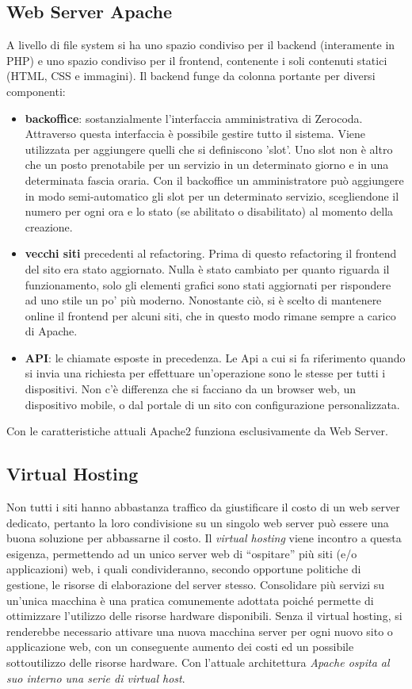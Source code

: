 \subsection{Web Server Apache}
A livello di file system si ha uno spazio condiviso per il backend (interamente in PHP) e uno spazio condiviso per il frontend, contenente i soli contenuti statici (HTML, CSS e immagini). Il backend funge da colonna portante per diversi componenti:
\begin{itemize}
    \item \textbf{backoffice}: sostanzialmente l'interfaccia amministrativa di Zerocoda. Attraverso questa interfaccia è possibile gestire tutto il sistema. Viene utilizzata per aggiungere quelli che si definiscono 'slot'. Uno slot non è altro che un posto prenotabile per un servizio in un determinato giorno e in una determinata fascia oraria. Con il backoffice un amministratore può aggiungere in modo semi-automatico gli slot per un determinato servizio, scegliendone il numero per ogni ora e lo stato (se abilitato o disabilitato) al momento della creazione.
    \item \textbf{vecchi siti } precedenti al refactoring. Prima di questo refactoring il frontend del sito era stato aggiornato. Nulla è stato cambiato per quanto riguarda il funzionamento, solo gli elementi grafici sono stati aggiornati per rispondere ad uno stile un po' più moderno. Nonostante ciò, si è scelto di mantenere online il frontend per alcuni siti, che in questo modo rimane sempre a carico di Apache.
    \item \textbf{API}: le chiamate esposte in precedenza. Le Api a cui si fa riferimento quando si invia una richiesta per effettuare un'operazione sono le stesse per tutti i dispositivi. Non c'è differenza che si facciano da un browser web, un dispositivo mobile, o dal portale di un sito con configurazione personalizzata.
\end{itemize}   
Con le caratteristiche attuali Apache2 funziona esclusivamente da Web Server.

\subsection{Virtual Hosting}
Non tutti i siti hanno abbastanza traffico da giustificare il costo di un web server dedicato, pertanto la loro condivisione su un singolo web server può essere una buona soluzione per abbassarne il costo. Il \emph{virtual hosting} viene incontro a questa esigenza, permettendo ad un unico server web di “ospitare” più siti (e/o applicazioni) web, i quali condivideranno, secondo opportune politiche di gestione, le risorse di elaborazione del server stesso. Consolidare più servizi su un’unica macchina è una pratica comunemente adottata poiché permette di ottimizzare l’utilizzo delle risorse hardware disponibili. Senza il virtual hosting, si renderebbe necessario attivare una nuova macchina server per ogni nuovo sito o applicazione web, con un conseguente aumento dei costi ed un possibile sottoutilizzo delle risorse hardware. Con l'attuale architettura \textit{Apache ospita al suo interno una serie di virtual host}.


